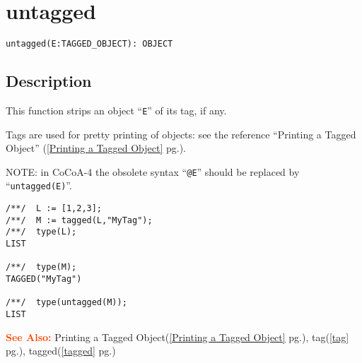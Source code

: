 \documentclass[a4paper]{mybook}
\newenvironment{command}{}{} %
\newcommand\SeeAlso{\par\textcolor{OrangeRed}{\textbf{\large See Also: }}}
\begin{document}
\section{untagged}
\label{untagged}
\begin{command} %


\begin{Verbatim}[label=syntax, rulecolor=\color{MidnightBlue},
frame=single]
untagged(E:TAGGED_OBJECT): OBJECT
\end{Verbatim}


\subsection*{Description}

This function strips an object ``\verb&E&'' of its tag, if any.
\par 
Tags are used for pretty printing of objects: see the reference
``Printing a Tagged Object'' (\ref{Printing a Tagged Object} pg.\pageref{Printing a Tagged Object}).
\par 
NOTE: in CoCoA-4 the obsolete syntax ``\verb&@E&'' should be replaced
by ``\verb&untagged(E)&''.
\begin{Verbatim}[label=example, rulecolor=\color{PineGreen}, frame=single]
/**/  L := [1,2,3];
/**/  M := tagged(L,"MyTag");
/**/  type(L);
LIST

/**/  type(M);
TAGGED("MyTag")

/**/  type(untagged(M));
LIST
\end{Verbatim}


\SeeAlso %
  Printing a Tagged Object(\ref{Printing a Tagged Object} pg.\pageref{Printing a Tagged Object}), 
    tag(\ref{tag} pg.\pageref{tag}), 
    tagged(\ref{tagged} pg.\pageref{tagged})
\end{command} %
\end{document}
